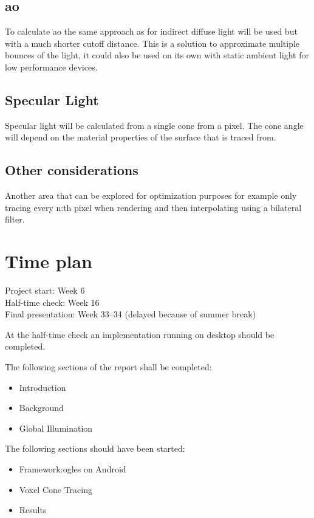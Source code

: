 \documentclass[a4paper, 12pt]{article}
\begin{document}
\subsection{\acrlong{ao}}

To calculate \gls{ao} the same approach as for indirect diffuse light will be used but with a much shorter cutoff distance. This is a solution to approximate multiple bounces of the light, it could also be used on its own with static ambient light for low performance devices.

\subsection{Specular Light}

Specular light will be calculated from a single cone from a pixel. The cone angle will depend on the material properties of the surface that is traced from.

\subsection{Other considerations}

Another area that can be explored for optimization purposes for example only tracing every n:th pixel when rendering and then interpolating using a bilateral filter. 

\section{Time plan}
\label{sec:Time plan}

Project start: Week 6 \\
Half-time check: Week 16 \\
Final presentation: Week 33--34 (delayed because of summer break)

At the half-time check an implementation running on desktop should be completed.

The following sections of the report shall be completed:
\begin{itemize}
  \item Introduction
  \item Background
  \item Global Illumination
\end{itemize}

The following sections should have been started:
\begin{itemize}
  \item Framework:\@ \gls{ogles} on Android
  \item Voxel Cone Tracing
  \item Results
\end{itemize}
\end{document}
